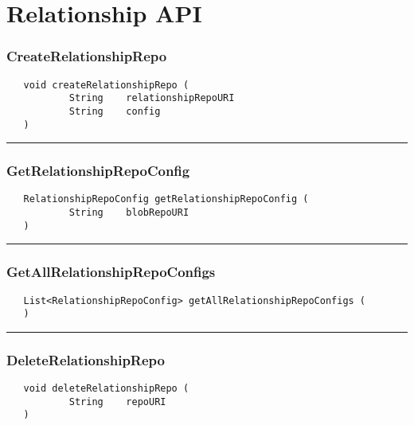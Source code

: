 \chapter{Relationship API}

\subsection{CreateRelationshipRepo}
\label{Api:CreateRelationshipRepo}
\begin{verbatim}
   void createRelationshipRepo (
           String    relationshipRepoURI
           String    config
   )
\end{verbatim}



\rule{15cm}{2pt}
\subsection{GetRelationshipRepoConfig}
\label{Api:GetRelationshipRepoConfig}
\begin{verbatim}
   RelationshipRepoConfig getRelationshipRepoConfig (
           String    blobRepoURI
   )
\end{verbatim}



\rule{15cm}{2pt}
\subsection{GetAllRelationshipRepoConfigs}
\label{Api:GetAllRelationshipRepoConfigs}
\begin{verbatim}
   List<RelationshipRepoConfig> getAllRelationshipRepoConfigs (
   )
\end{verbatim}



\rule{15cm}{2pt}
\subsection{DeleteRelationshipRepo}
\label{Api:DeleteRelationshipRepo}
\begin{verbatim}
   void deleteRelationshipRepo (
           String    repoURI
   )
\end{verbatim}



